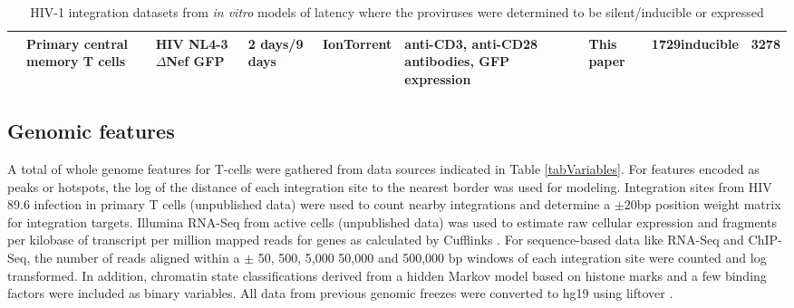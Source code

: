 \documentclass[../sherrill-Mix_thesis.tex]{subfiles}
\begin{document}
\begin{table}
{\begin{tabular}{|p{0.49in}|p{0.53in}|p{0.8in}|P{0.6in}|p{0.6in}|P{0.75in}|P{0.59in}|p{0.59in}|p{0.6in}|}
			\hline     
			\Memory{}         & Primary central memory \cdFour{} T cells             & HIV NL4-3 $\Delta$Nef GFP                                                                      & 2 days/9 days                            & Ion\-Torrent                 & anti-CD3, anti-CD28 antibodies, GFP expression         & This paper           &  1729\newline inducible                                   & 3278                                \\ 
			\hline
		\end{tabular}
	}
	\caption[Integrations from \textit{in vitro} models of latency]{HIV-1 integration datasets from \textit{in vitro} models of latency where the proviruses were determined to be silent/inducible or expressed}
	\label{tabLatencySamples}
	\end{table}

	\subsection{Genomic features}
		A total of \nFeatures{} whole genome features for \cdFour{} T-cells were gathered from data sources indicated in Table \ref{tabVariables}.  For features encoded as peaks or hotspots, the log of the distance of each integration site to the nearest border was used for modeling. Integration sites from HIV 89.6 infection in primary \cdFour{} T cells (unpublished data) were used to count nearby integrations and determine a $\pm20$bp position weight matrix for integration targets. Illumina RNA-Seq from active \cdFour{} cells (unpublished data) was used to estimate raw cellular expression and fragments per kilobase of transcript per million mapped reads for genes as calculated by Cufflinks \citep{Trapnell2010}. For sequence-based data like RNA-Seq and ChIP-Seq, the number of reads aligned within a $\pm$ 50, 500, 5,000 50,000 and 500,000 bp windows of each integration site were counted and log transformed. In addition, chromatin state classifications derived from a hidden Markov model based on histone marks and a few binding factors \citep{Ernst2010} were included as binary variables. All data from previous genomic freezes were converted to hg19 using liftover \citep{Hinrichs2006}. 
\end{document}
